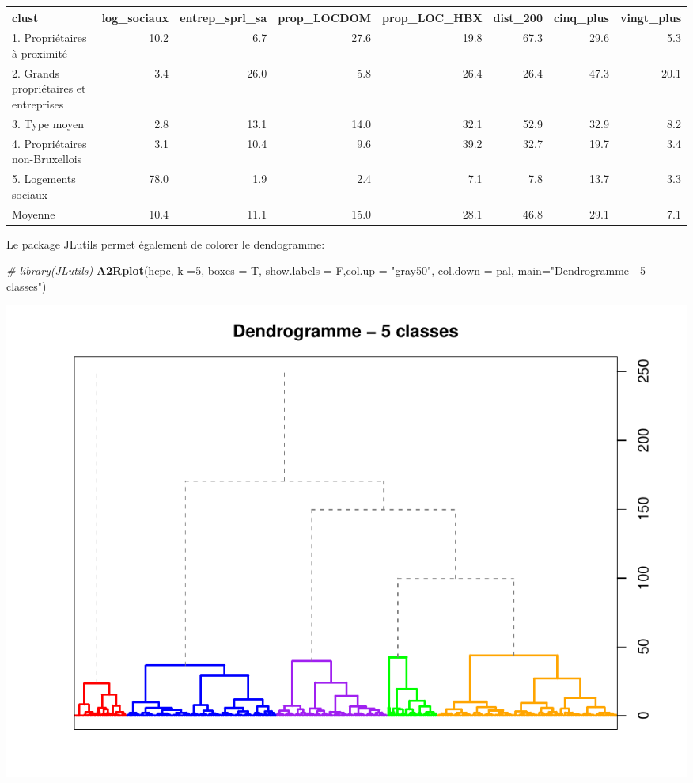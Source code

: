 \documentclass[
]{book}
\newenvironment{Shaded}{\begin{snugshade}}{\end{snugshade}}
\newcommand{\AttributeTok}[1]{\textcolor[rgb]{0.13,0.29,0.53}{#1}}
\newcommand{\CommentTok}[1]{\textcolor[rgb]{0.56,0.35,0.01}{\textit{#1}}}
\newcommand{\DecValTok}[1]{\textcolor[rgb]{0.00,0.00,0.81}{#1}}
\newcommand{\FunctionTok}[1]{\textcolor[rgb]{0.13,0.29,0.53}{\textbf{#1}}}
\newcommand{\NormalTok}[1]{#1}
\newcommand{\StringTok}[1]{\textcolor[rgb]{0.31,0.60,0.02}{#1}}
\begin{document}
\begin{tabular}{l|r|r|r|r|r|r|r}
\hline
clust & log\_sociaux & entrep\_sprl\_sa & prop\_LOCDOM & prop\_LOC\_HBX & dist\_200 & cinq\_plus & vingt\_plus\\
\hline
1. Propriétaires à proximité & 10.2 & 6.7 & 27.6 & 19.8 & 67.3 & 29.6 & 5.3\\
\hline
2. Grands propriétaires et entreprises & 3.4 & 26.0 & 5.8 & 26.4 & 26.4 & 47.3 & 20.1\\
\hline
3. Type moyen & 2.8 & 13.1 & 14.0 & 32.1 & 52.9 & 32.9 & 8.2\\
\hline
4. Propriétaires non-Bruxellois & 3.1 & 10.4 & 9.6 & 39.2 & 32.7 & 19.7 & 3.4\\
\hline
5. Logements sociaux & 78.0 & 1.9 & 2.4 & 7.1 & 7.8 & 13.7 & 3.3\\
\hline
Moyenne & 10.4 & 11.1 & 15.0 & 28.1 & 46.8 & 29.1 & 7.1\\
\hline
\end{tabular}

Le package JLutils permet également de colorer le dendogramme:

\begin{Shaded}
\begin{Highlighting}[]
\CommentTok{\# library(JLutils)}
\FunctionTok{A2Rplot}\NormalTok{(hcpc, }\AttributeTok{k =}\DecValTok{5}\NormalTok{, }\AttributeTok{boxes =}\NormalTok{ T, }\AttributeTok{show.labels =}\NormalTok{ F,}\AttributeTok{col.up =} \StringTok{"gray50"}\NormalTok{,}
        \AttributeTok{col.down =}\NormalTok{ pal, }\AttributeTok{main=}\StringTok{"Dendrogramme {-} 5 classes"}\NormalTok{)}
\end{Highlighting}
\end{Shaded}

\includegraphics{bookdown-demo_files/figure-latex/unnamed-chunk-108-1.pdf}
\end{document}
